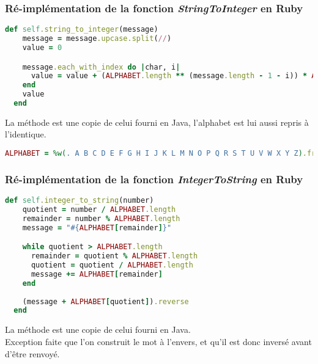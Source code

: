 \documentclass[a4paper,10pt]{article}
\begin{document}
\subsubsection{Ré-implémentation de la fonction \textit{StringToInteger} en Ruby}
\begin{lstlisting}[language=Ruby]
  def self.string_to_integer(message)
    message = message.upcase.split(//)
    value = 0

    message.each_with_index do |char, i|
      value = value + (ALPHABET.length ** (message.length - 1 - i)) * ALPHABET.index(char)
    end
    value
  end
\end{lstlisting}
La méthode est une copie de celui fourni en Java, l'alphabet est lui aussi repris à l'identique.\\
\begin{lstlisting}[language=Ruby]
  ALPHABET = %w(. A B C D E F G H I J K L M N O P Q R S T U V W X Y Z).freeze
\end{lstlisting}

\subsubsection{Ré-implémentation de la fonction \textit{IntegerToString} en Ruby}
\begin{lstlisting}[language=Ruby]
  def self.integer_to_string(number)
    quotient = number / ALPHABET.length
    remainder = number % ALPHABET.length
    message = "#{ALPHABET[remainder]}"

    while quotient > ALPHABET.length
      remainder = quotient % ALPHABET.length
      quotient = quotient / ALPHABET.length
      message += ALPHABET[remainder]
    end
    
    (message + ALPHABET[quotient]).reverse
  end
\end{lstlisting}
La méthode est une copie de celui fourni en Java.\\
Exception faite que l'on construit le mot à l'envers, et qu'il est donc inversé avant d'être renvoyé. 
\end{document}
